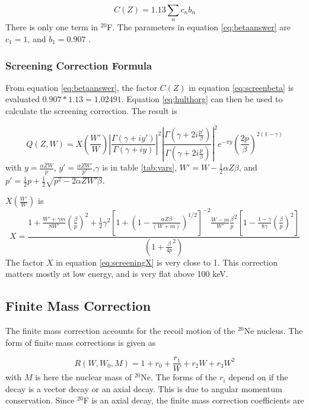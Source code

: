 \documentclass[../MaxHughesThesis.tex]{subfiles}
\begin{document}
\begin{equation}
	C(Z) = 1.13 \sum_{n} c_{n} b_{n}
	\label{eq:betaanswer}
\end{equation} 
There is only one term in $^{20}$F. 
The parameters in equation \ref{eq:betaanswer} are $c_{1} = 1$, and $b_{1} = 0.907$ \cite{Bya56}.

\subsubsection{Screening Correction Formula}
From equation \ref{eq:betaanswer}, the factor $C(Z)$ in equation \ref{eq:screenbeta} is evaluated $0.907 * 1.13 = 1.02491$.
Equation \ref{eq:hulthorg} can then be used to calculate the screening correction.
The result is \cite{Buh84} %

\begin{equation}
	Q(Z,W) = X(\frac{W'}{W})|\frac{\Gamma(\gamma + i y')}{\Gamma(\gamma+ i y)}|^{2}|\frac{\Gamma(\gamma + 2 i \frac{p'}{\beta})}{\Gamma(\gamma + 2 i \frac{p}{\beta})}|^{2}e^{-\pi y}(\frac{2p}{\beta})^{2(1 - \gamma)}
	\label{eq:screeningQ}
\end{equation}
with $y = \frac{\alpha Z W}{p}$, $y' = \frac{\alpha Z W'}{p'}$,$ \gamma$ is in table \ref{tab:vars}, $W' = W - \frac{1}{2}\alpha Z \beta$, and $p' = \frac{1}{2}p + \frac{1}{2}\sqrt{p^{2} - 2 \alpha Z W' \beta}$.

$X(\frac{W'}{W})$ is %
\begin{equation}
	X = \frac{1 + \frac{W' + \gamma m}{8 W'} (\frac{\beta}{p})^{2} + \frac{1}{2}\gamma^{2}[1 + (1 - \frac{\alpha Z \beta}{(W + m)})^{1/2}]^{-2} \frac{W - m}{W'} \frac{\beta}{p}^{2}[1 - \frac{1 - \gamma}{8\gamma}(\frac{\beta}{p})^{2}]}{(1 + \frac{\beta}{4p}^{2})}
	\label{eq:screeningX}
\end{equation}
The factor $X$ in equation \ref{eq:screeningX} is very close to 1.
This correction matters mostly at low energy, and is very flat above 100 keV.

\subsection{Finite Mass Correction}
The finite mass correction accounts for the recoil motion of the $^{20}$Ne nucleus.
The form of finite mass corrections is given as \cite{WIL90} %

\begin{equation}
	R(W,W_{0},M) = 1 + r_{0} + \frac{r_{1}}{W} + r_{2}W + r_{3}W^{2}
	\label{eq:finitemass}
\end{equation}
with $M$ is here the nuclear mass of $^{20}$Ne.
The forms of the $r_{i}$ depend on if the decay is a vector decay or an axial decay. 
This is due to angular momentum conservation.
Since $^{20}$F is an axial decay, the finite mass correction coefficients are %
\end{document}
